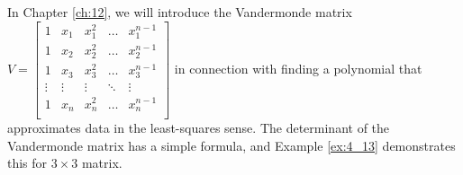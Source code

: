 \documentclass[../main.tex]{subfiles}
\begin{document}
\begin{example}
\end{example}

In Chapter \ref{ch:12}, we will introduce the Vandermonde matrix \(V = \begin{bmatrix}
  1 & x_{1} & x_{1}^{2} & \hdots & x_{1}^{n-1}\\
  1 & x_{2} & x_{2}^{2} & \hdots & x_{2}^{n-1}\\
  1 & x_{3} & x_{3}^{2} & \hdots & x_{3}^{n-1}\\
  \vdots & \vdots & \vdots & \ddots & \vdots\\
  1 & x_{n} & x_{n}^{2} & \hdots & x_{n}^{n-1}\\
 \end{bmatrix}\)
in connection with finding a polynomial that approximates data in the least-squares sense. The determinant of the Vandermonde matrix has a simple formula, and Example \ref{ex:4_13} demonstrates this for \(3 \times 3\) matrix.
\end{document}
